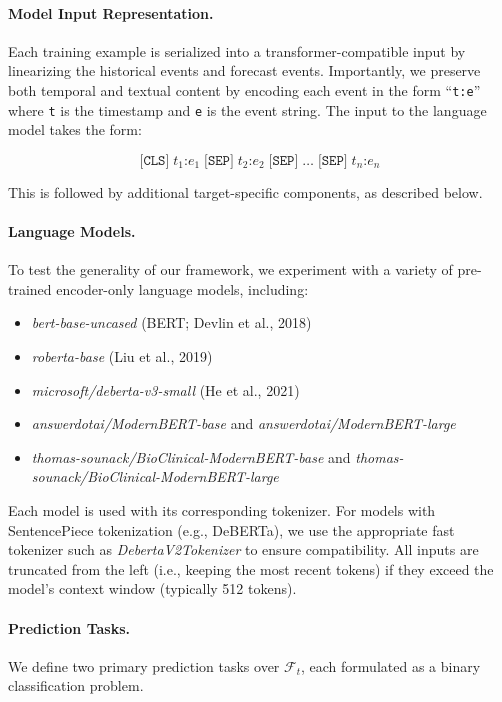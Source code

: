\paragraph{Model Input Representation.}
Each training example is serialized into a transformer-compatible input by linearizing the historical events and forecast events. 
Importantly, we preserve both temporal and textual content by encoding each event in the form ``\texttt{t:e}'' where \texttt{t} is the timestamp and \texttt{e} is the event string.
The input to the language model takes the form:

\begin{equation}
\texttt{[CLS]} \; t_1\texttt{:}e_1 \; \texttt{[SEP]} \; t_2\texttt{:}e_2 \; \texttt{[SEP]} \; \dots \; \texttt{[SEP]} \; t_n\texttt{:}e_n
\end{equation}

This is followed by additional target-specific components, as described below.

\paragraph{Language Models.}
To test the generality of our framework, we experiment with a variety of pre-trained encoder-only language models, including:
\begin{itemize}
    \item \textit{bert-base-uncased} (BERT; Devlin et al., 2018)
    \item \textit{roberta-base} (Liu et al., 2019)
    \item \textit{microsoft/deberta-v3-small} (He et al., 2021)
    \item \textit{answerdotai/ModernBERT-base} and \textit{answerdotai/ModernBERT-large}
    \item \textit{thomas-sounack/BioClinical-ModernBERT-base} and \textit{thomas-sounack/BioClinical-ModernBERT-large} 
\end{itemize}
Each model is used with its corresponding tokenizer. 
For models with SentencePiece tokenization (e.g., DeBERTa), we use the appropriate fast tokenizer such as \textit{DebertaV2Tokenizer} to ensure compatibility. 
All inputs are truncated from the left (i.e., keeping the most recent tokens) if they exceed the model's context window (typically 512 tokens).

\paragraph{Prediction Tasks.}
We define two primary prediction tasks over $\mathcal{F}_t$, each formulated as a binary classification problem.

